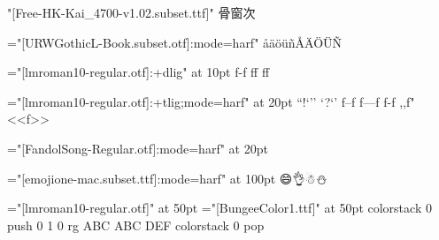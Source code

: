 \btest
\font\test"[Free-HK-Kai_4700-v1.02.subset.ttf]"\test
骨窗次
\etest

\btest
\font\test="[URWGothicL-Book.subset.otf]:mode=harf"\test
åäöüñÅÄÖÜÑ
\etest

\btest
\font\test="[lmroman10-regular.otf]:+dlig" at 10pt\test
f-f f\-f f\discretionary{-}{-}{-}f
\etest

\btest
\font\test="[lmroman10-regular.otf]:+tlig;mode=harf" at 20pt\test
``!`'' `?`' f--f f---f f-f ,,f" <<f>>
\etest

\btest
\font\test="[FandolSong-Regular.otf]:mode=harf" at 20pt\test
\the{}\font\quad\the{}\font
\etest

\btest
\font\test="[emojione-mac.subset.ttf]:mode=harf" at 100pt\test
😄👌☃⛄
\etest

\btest
\font\testn="[lmroman10-regular.otf]" at 50pt
\font\testc="[BungeeColor1.ttf]" at 50pt
\pdfextension colorstack 0 push {0 1 0 rg}
\testn
ABC {\testc ABC} DEF
\pdfextension colorstack 0 pop
\etest
\bye
